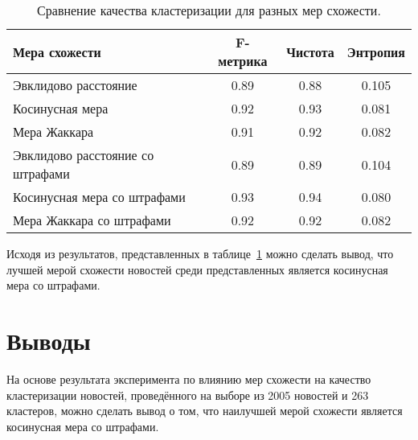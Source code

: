 \begin{table}[h]
    \centering
    \begin{tabular}{l | c | c | c}
        \hline
        Мера схожести & F-метрика & Чистота & Энтропия \\ \hline\hline
        Эвклидово расстояние             & 0.89 & 0.88 & 0.105  \\ \hline
        Косинусная мера                  & 0.92 & 0.93 & 0.081  \\ \hline
        Мера Жаккара                     & 0.91 & 0.92 & 0.082  \\ \hline
        Эвклидово расстояние со штрафами & 0.89 & 0.89 & 0.104  \\ \hline
        Косинусная мера со штрафами      & 0.93 & 0.94 & 0.080  \\ \hline
        Мера Жаккара со штрафами         & 0.92 & 0.92 & 0.082  \\
        \hline
    \end{tabular}
    \caption{Сравнение качества кластеризации для разных мер схожести.}
    \label{tbl:sim-quality}
\end{table}

Исходя из результатов, представленных в таблице~\ref{tbl:sim-quality} можно сделать вывод, что лучшей мерой схожести новостей среди представленных является косинусная мера со штрафами.

\section{Выводы}
На основе результата эксперимента по влиянию мер схожести на качество кластеризации новостей, проведённого на выборе из 2005 новостей и 263 кластеров, можно сделать вывод о том, что наилучшей мерой схожести является косинусная мера со штрафами.
